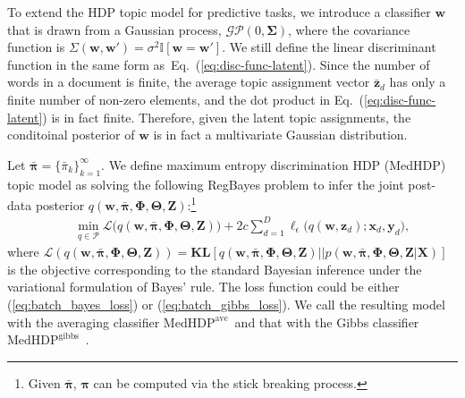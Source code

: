 \documentclass[twoside,11pt]{article}
\newcommand{\xv}{\bm{x}}
\newcommand{\Xv}{\bm{X}}
\newcommand{\yv}{\bm{y}}
\newcommand{\zv}{\bm{z}}
\newcommand{\Zv}{\bm{Z}}
\newcommand{\wv}{\bm{w}}
\newcommand{\Thetav}{\bm{\Theta}}
\newcommand{\Phiv}{\bm{\Phi}}
\newcommand{\piv}{\bm \pi}
\newcommand{\barpiv}{\bm{\bar{\pi}}}
\newcommand{\Sigmav}{\bm \Sigma}
\newcommand{\KL}{\textbf{KL}}
\newcommand{\ind}{\mathbb{I}}
\newcommand\MedHDPave{$\text{MedHDP}^{\text{ave}}$~}
\newcommand\MedHDPgibbs{$\text{MedHDP}^{\text{gibbs}}$~}
\newcommand{\strin}[1]{\todo[size=\small, color=green!40]{\bf\sf  #1}}
\newcommand{\jun}[1]{\marginpar{\color{blue}\tiny{Jun: #1}}}
\begin{document}
To extend the HDP topic model for predictive tasks, we introduce a classifier $\wv$ that is drawn from a Gaussian process, $\mathcal{GP}(0, \Sigmav)$, where the covariance function is $\Sigma(\wv, \wv') = \sigma^2 \ind[\wv = \wv']$. We still define the linear discriminant function in the same form as~Eq.~(\ref{eq:disc-func-latent}). Since the number of words in a document is finite, the average topic assignment vector $\bar{\zv}_{d}$ has only a finite number of non-zero elements, and the dot product in Eq.~(\ref{eq:disc-func-latent}) is in fact finite. Therefore, given the latent topic assignments, the conditoinal posterior of $\wv$ is in fact a multivariate Gaussian distribution.

Let $\bm{\bar{\pi}} = \{\bar{\pi}_k\}_{k=1}^{\infty}$. We define maximum entropy discrimination HDP (MedHDP) topic model as solving the following RegBayes problem to infer the joint post-data posterior $q(\wv, \barpiv, \Phiv, \Thetav,  \Zv)$:\footnote{Given $\barpiv$, $\piv$ can be computed via the stick breaking process.}
%
\setlength\arraycolsep{-2pt} \begin{eqnarray} \label{eq:medhdp}
&& \min\limits_{q \in \mathcal{P}}  {\mathcal{L}\Big( q(\wv, \barpiv, \Phiv, \Thetav, \Zv) \Big)}+ 2 c \sum\limits_{d=1}^{D}{\ell_{\epsilon}\Big( q(\wv, \zv_d); \xv_d, \yv_d \Big)},
\end{eqnarray}
%
where $\mathcal{L}( q(\wv, \barpiv, \Phiv, \Thetav, \Zv) ) = \KL[q(\wv, \barpiv, \Phiv, \Thetav, \Zv) || p(\wv, \barpiv, \Phiv, \Thetav,  \Zv | \Xv)]$ is the objective corresponding to the standard Bayesian inference under the variational formulation of Bayes' rule. The loss function could be either (\ref{eq:batch_bayes_loss}) or (\ref{eq:batch_gibbs_loss}). We call the resulting model with the averaging classifier \MedHDPave and that with the Gibbs classifier \MedHDPgibbs.
\end{document}

